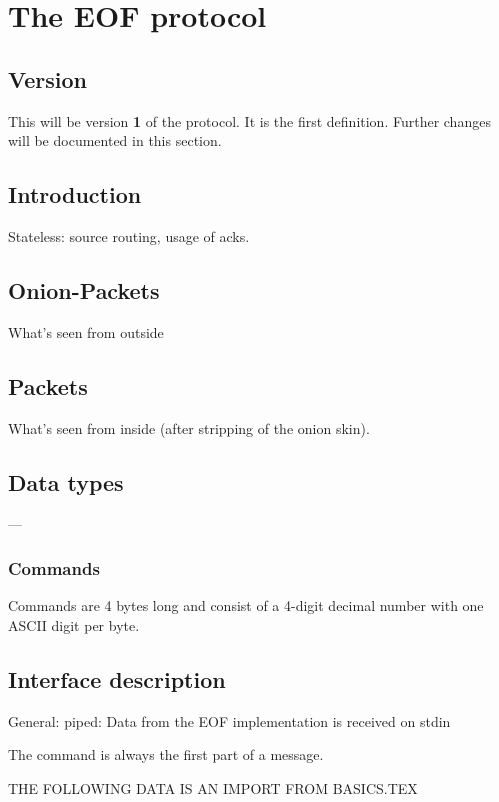 \documentclass[12pt,a4paper]{book}
\begin{document}
\chapter{The EOF protocol}
\section{Version}
This will be version \textbf{1} of the protocol. It is the first definition.
Further changes will be documented in this section.
\section{Introduction}
Stateless: source routing, usage of acks.
\section{Onion-Packets}
What's seen from outside
\section{Packets}
What's seen from inside (after stripping of the onion skin).
\section{Data types}
---
\subsection{Commands}
Commands are 4 bytes long and consist of a 4-digit decimal number with one ASCII digit per byte.
\section{Interface description}
General: piped:
Data from the EOF implementation is received on stdin 

The command is always the first part of a message.

THE FOLLOWING DATA IS AN IMPORT FROM BASICS.TEX
\end{document}
